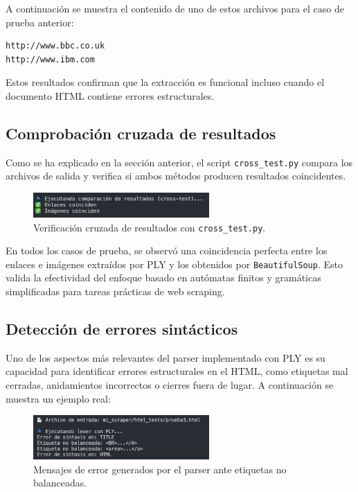 \documentclass[11pt,a4paper]{article}
\begin{document}
A continuación se muestra el contenido de uno de estos archivos para el caso de prueba anterior:

\begin{verbatim}
http://www.bbc.co.uk
http://www.ibm.com
\end{verbatim}

Estos resultados confirman que la extracción es funcional incluso cuando el documento HTML contiene errores estructurales.

\subsection{Comprobación cruzada de resultados}

Como se ha explicado en la sección anterior, el script \texttt{cross\_test.py} compara los archivos de salida y verifica si ambos métodos producen resultados coincidentes.

\begin{figure}[H]
    \centering
    \includegraphics[width=0.6\textwidth]{img/cross_test_ok.png}
    \caption*{Verificación cruzada de resultados con \texttt{cross\_test.py}.}
\end{figure}

En todos los casos de prueba, se observó una coincidencia perfecta entre los enlaces e imágenes extraídos por PLY y los obtenidos por \texttt{BeautifulSoup}. Esto valida la efectividad del enfoque basado en autómatas finitos y gramáticas simplificadas para tareas prácticas de web scraping.

\subsection{Detección de errores sintácticos}

Uno de los aspectos más relevantes del parser implementado con PLY es su capacidad para identificar errores estructurales en el HTML, como etiquetas mal cerradas, anidamientos incorrectos o cierres fuera de lugar. A continuación se muestra un ejemplo real:

\begin{figure}[H]
    \centering
    \includegraphics[width=0.6\textwidth]{img/errores_parser.png}
    \caption*{Mensajes de error generados por el parser ante etiquetas no balanceadas.}
\end{figure}
\end{document}
